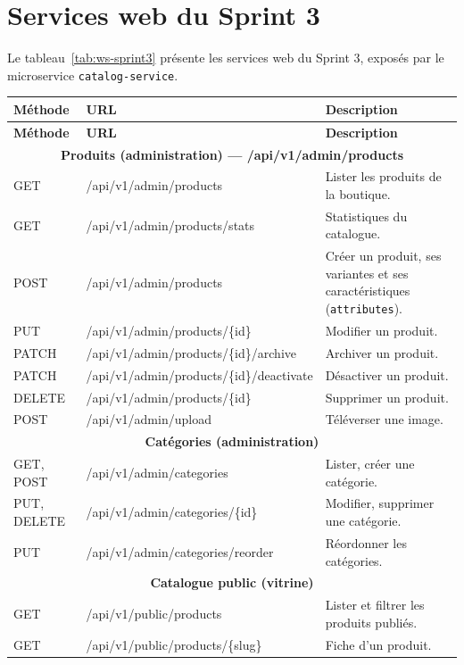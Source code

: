 \section{Services web du Sprint 3}
Le tableau~\ref{tab:ws-sprint3} présente les services web du Sprint 3, exposés par le microservice \texttt{catalog-service}.
\renewcommand{\arraystretch}{1.15}
\setlength{\tabcolsep}{4pt}
\begin{longtable}{|p{2.5cm}|p{8.8cm}|p{4.2cm}|}
\hline
\textbf{Méthode} & \textbf{URL} & \textbf{Description} \\
\hline
\endfirsthead
\hline
\textbf{Méthode} & \textbf{URL} & \textbf{Description} \\
\hline
\endhead
\multicolumn{3}{|c|}{\textbf{Produits (administration) --- /api/v1/admin/products}} \\
\hline
GET & /api/v1/admin/products & Lister les produits de la boutique. \\
\hline
GET & /api/v1/admin/products/stats & Statistiques du catalogue. \\
\hline
POST & /api/v1/admin/products & Créer un produit, ses variantes et ses caractéristiques (\texttt{attributes}). \\
\hline
PUT & /api/v1/admin/products/\{id\} & Modifier un produit. \\
\hline
PATCH & /api/v1/admin/products/\{id\}/archive & Archiver un produit. \\
\hline
PATCH & /api/v1/admin/products/\{id\}/deactivate & Désactiver un produit. \\
\hline
DELETE & /api/v1/admin/products/\{id\} & Supprimer un produit. \\
\hline
POST & /api/v1/admin/upload & Téléverser une image. \\
\hline
\multicolumn{3}{|c|}{\textbf{Catégories (administration)}} \\
\hline
GET, POST & /api/v1/admin/categories & Lister, créer une catégorie. \\
\hline
PUT, DELETE & /api/v1/admin/categories/\{id\} & Modifier, supprimer une catégorie. \\
\hline
PUT & /api/v1/admin/categories/reorder & Réordonner les catégories. \\
\hline
\multicolumn{3}{|c|}{\textbf{Catalogue public (vitrine)}} \\
\hline
GET & /api/v1/public/products & Lister et filtrer les produits publiés. \\
\hline
GET & /api/v1/public/products/\{slug\} & Fiche d'un produit. \\

\end{longtable}

